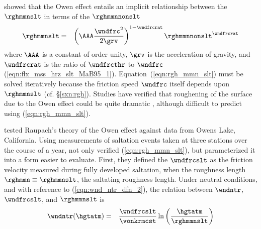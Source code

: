 \documentclass[12pt,twoside]{book}
\begin{document}
\cite{Rau91} showed that the Owen effect entails an implicit 
relationship between the 
$\rghmmnslt$ in terms of the 
$\rghmmnnonslt$
\begin{eqnarray}
\rghmmnslt & = & \left( \AAA 
\frac{\wndfrc^{2}}{2 \grv} \right)^{1-\wndfrcrat} \rghmmnnonslt^{\wndfrcrat}
\label{eqn:rgh_mmn_slt}
\end{eqnarray}
where $\AAA$ is a constant of order unity, $\grv$ is the acceleration
of gravity, and $\wndfrcrat$ is the ratio of $\wndfrcthr$ to $\wndfrc$
(\ref{eqn:flx_mss_hrz_slt_MaB95_1}).
Equation~(\ref{eqn:rgh_mmn_slt}) must be solved iteratively
because the friction speed $\wndfrc$ itself depends upon $\rghmmnslt$ 
(cf. \S\ref{sxn:rgh}).
Studies have verified that roughening of the surface due to the Owen
effect could be quite dramatic \cite[]{GMB98}, although difficult to
predict using (\ref{eqn:rgh_mmn_slt}).

\cite{GMB98} tested Raupach's theory \cite[]{Rau91} of the Owen
effect \cite[]{Owe64} against data from Owens Lake, California.  
Using measurements of saltation events taken at three stations
over the course of a year, \citeauthor{GMB98} not only verified
(\ref{eqn:rgh_mmn_slt}), but parameterized it into a form easier
to evaluate.
First, they defined the 
$\wndfrcslt$ as the friction velocity measured during fully developed 
saltation, when the roughness length $\rghmmn \equiv \rghmmnslt$, the
saltating roughness length. 
Under neutral conditions, and with reference to
(\ref{eqn:wnd_ntr_dfn_2}), the relation between $\wndntr$,
$\wndfrcslt$, and $\rghmmnslt$ is 
\begin{eqnarray}
\wndntr ( \hgtatm ) & = & 
\frac{\wndfrcslt}{\vonkrmcst} \ln \left( \frac{\hgtatm}{\rghmmnslt} \right)
\label{eqn:wnd_ntr_dfn_3}
\end{eqnarray}
\end{document}

